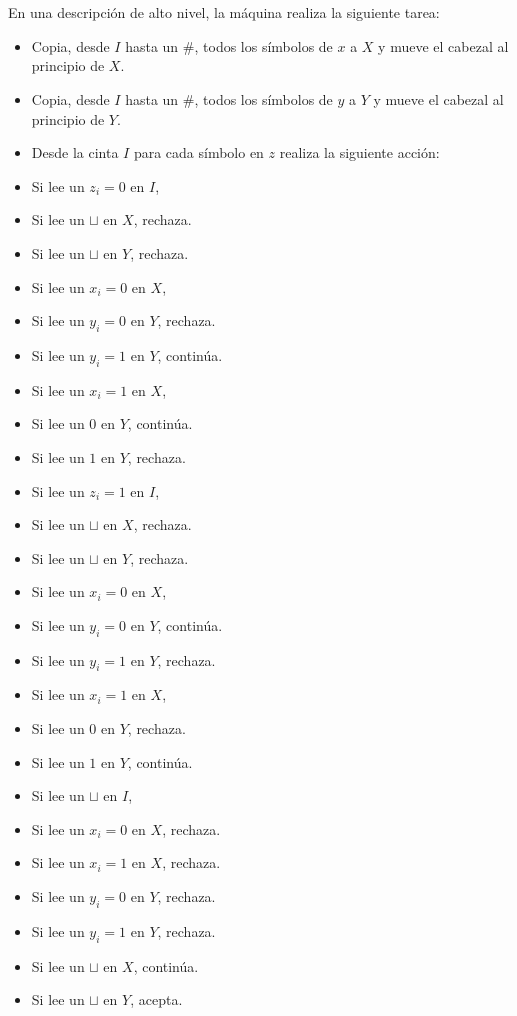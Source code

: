 \documentclass[spanish]{article}
\begin{document}
\\\\
En una descripción de alto nivel, la máquina realiza la siguiente tarea:
\begin{itemize}
\item Copia, desde $I$ hasta un $\#$, todos los símbolos de $x$ a $X$ y mueve el cabezal al principio de $X$.
\item Copia, desde $I$ hasta un $\#$, todos los símbolos de $y$ a $Y$ y mueve el cabezal al principio de $Y$.
\item Desde la cinta $I$ para cada símbolo en $z$ realiza la siguiente acción:
\item \tab Si lee un $z_i = 0$ en $I$,
\item \tab \tab Si lee un $\sqcup$ en $X$, rechaza.
\item \tab \tab Si lee un $\sqcup$ en $Y$, rechaza.
\item \tab \tab Si lee un $x_i = 0$ en $X$,
\item \tab \tab \tab Si lee un $y_i = 0$ en $Y$, rechaza.
\item \tab \tab \tab Si lee un $y_i = 1$ en $Y$, continúa.
\item \tab \tab Si lee un $x_i = 1$ en $X$,
\item \tab \tab \tab Si lee un $0$ en $Y$, continúa.
\item \tab \tab \tab Si lee un $1$ en $Y$, rechaza.
\item \tab Si lee un $z_i = 1$ en $I$,
\item \tab \tab Si lee un $\sqcup$ en $X$, rechaza.
\item \tab \tab Si lee un $\sqcup$ en $Y$, rechaza.
\item \tab \tab Si lee un $x_i = 0$ en $X$,
\item \tab \tab \tab Si lee un $y_i = 0$ en $Y$, continúa.
\item \tab \tab \tab Si lee un $y_i = 1$ en $Y$, rechaza.
\item \tab \tab Si lee un $x_i = 1$ en $X$,
\item \tab \tab \tab Si lee un $0$ en $Y$, rechaza.
\item \tab \tab \tab Si lee un $1$ en $Y$, continúa.
\item \tab Si lee un $\sqcup$ en $I$,
\item \tab \tab Si lee un $x_i = 0$ en $X$, rechaza.
\item \tab \tab Si lee un $x_i = 1$ en $X$, rechaza.
\item \tab \tab Si lee un $y_i = 0$ en $Y$, rechaza.
\item \tab \tab Si lee un $y_i = 1$ en $Y$, rechaza.
\item \tab \tab Si lee un $\sqcup$ en $X$, continúa.
\item \tab \tab \tab Si lee un $\sqcup$ en $Y$, acepta.
\end{itemize}
\end{document}

